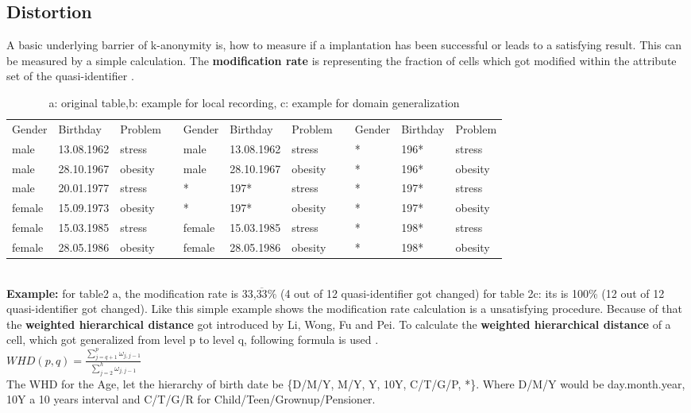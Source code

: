 \documentclass{llncs}
\begin{document}
\subsection{Distortion} 
A basic underlying barrier of k-anonymity is, how to measure if a implantation has been successful or leads to a satisfying result. This can be measured by a simple calculation.
 The \textbf{modification rate} is representing the fraction of cells which got modified within the attribute set of the quasi-identifier \cite{li2006achieving}.
\begin{table}[]
	\centering
	\label{table2}
		\caption{a: original table,b: example for local recording, c: example for domain generalization }
	\begin{tabular}{lllllllllll}
		\cline{1-3} \cline{5-7} \cline{9-11}
		Gender & Birthday   & Problem &  & Gender & Birthday   & Problem &  & Gender & Birthday & Problem \\ \cline{1-3} \cline{5-7} \cline{9-11} 
		male   & 13.08.1962 & stress  &  & male   & 13.08.1962 & stress  &  & *      & 196*     & stress  \\
		male   & 28.10.1967 & obesity &  & male   & 28.10.1967 & obesity &  & *      & 196*     & obesity \\
		male   & 20.01.1977 & stress  &  & *      & 197*       & stress  &  & *      & 197*     & stress  \\
		female & 15.09.1973 & obesity &  & *      & 197*       & obesity &  & *      & 197*     & obesity \\
		female & 15.03.1985 & stress  &  & female & 15.03.1985 & stress  &  & *      & 198*     & stress  \\
		female & 28.05.1986 & obesity &  & female & 28.05.1986 & obesity &  & *      & 198*     & obesity \\ \cline{1-3} \cline{5-7} \cline{9-11}
		\end{tabular}

\end{table}\\
\textbf{Example:} for table2 a, the modification rate is  33,$\overline{33}$\% (4 out of 12 quasi-identifier got changed) for table 2c: its is 100\% (12 out of 12 quasi-identifier got changed). Like this simple example shows the modification rate calculation is a unsatisfying procedure. Because of that the \textbf{weighted hierarchical distance} got introduced by Li, Wong, Fu and Pei. 
To calculate the \textbf{weighted hierarchical distance} of a cell, which got generalized from level p to level q, following formula is used \cite{li2006achieving}.\\
$ WHD (p, q) = \frac{\sum_{j=q+1}^{p} \omega_{j,j-1}}{\sum_{j=2}^{h} \omega_{j,j-1}} $\\
The WHD for the Age, let the hierarchy of birth date be \{D/M/Y, M/Y, Y, 10Y, C/T/G/P, *\}. Where D/M/Y  would be day.month.year, 10Y a 10 years interval and C/T/G/R for Child/Teen/Grownup/Pensioner.\\
\end{document}
